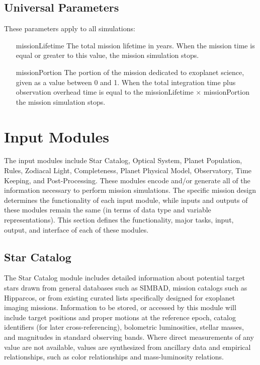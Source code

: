 \documentclass[cleanfoot]{asme2ej}
\begin{document}
\subsection{Universal Parameters}
These parameters apply to all simulations:

\begin{itemize}[leftmargin=1in,font={\ttfamily}]
\item[missionLifetime]  The total mission lifetime in years.  When the mission time is equal or greater to this value, the mission simulation stops.
\item[missionPortion]  The portion of the mission dedicated to exoplanet science, given as a value between 0 and 1.  When the total integration time plus observation overhead time is equal to the missionLifetime $\times$ missionPortion the mission simulation stops.
\end{itemize}


\section{Input Modules}\label{sec:modules}
The input modules include Star Catalog, Optical System, Planet Population, Rules, Zodiacal Light, Completeness, Planet Physical Model, Observatory, Time Keeping, and Post-Processing.  These modules encode and/or generate all of the information necessary to perform mission simulations.  The specific mission design determines the functionality of each input module, while inputs and outputs of these modules remain the same (in terms of data type and variable representations).  This section defines the functionality, major tasks, input, output, and interface of each of these modules.


\subsection{Star Catalog} \label{sec:starcatalog}
The Star Catalog module includes detailed information about potential target stars drawn from general databases such as SIMBAD, mission catalogs such as Hipparcos, or from existing curated lists specifically designed for exoplanet imaging missions.  Information to be stored, or accessed by this module will include target positions and proper motions at the reference epoch, catalog identifiers (for later cross-referencing), bolometric luminosities, stellar masses, and magnitudes in standard observing bands.  Where direct measurements of any value are not available, values are synthesized from ancillary data and empirical relationships, such as color relationships and mass-luminosity relations.
\end{document}
